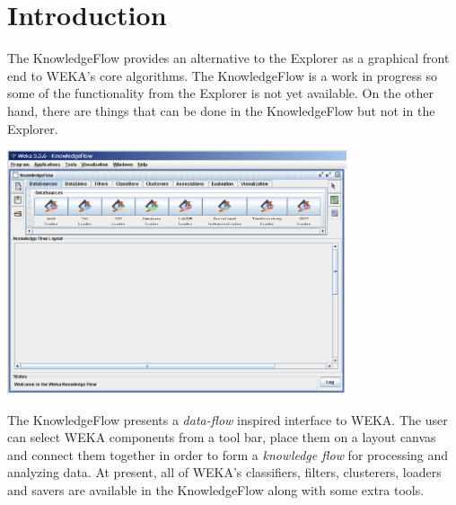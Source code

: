 %
%
%
%



\section{Introduction}

The KnowledgeFlow provides an alternative to the Explorer as a
graphical front end to WEKA's core algorithms. The KnowledgeFlow is a
work in progress so some of the functionality from the Explorer is not
yet available. On the other hand, there are things that can be done in
the KnowledgeFlow but not in the Explorer.

\begin{center}
  \includegraphics[angle=270,width=10cm]{images/knowledgeflow/knowledgeflow.eps}
\end{center}

The KnowledgeFlow presents a \textit{data-flow} inspired interface to
WEKA. The user can select WEKA components from a tool bar, place them
on a layout canvas and connect them together in order to form a
\textit{knowledge flow} for processing and analyzing data. At present, all of
WEKA's classifiers, filters, clusterers, loaders and savers are
available in the KnowledgeFlow along with some extra tools.

